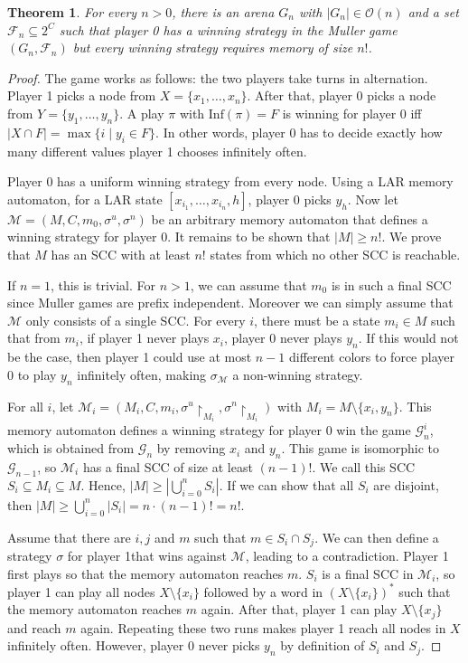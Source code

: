 \documentclass{article}
\newtheorem{theorem}{Theorem}
\begin{document}
\vspace{0.5cm}
\begin{theorem}
	For every $n > 0$, there is an arena $G_n$ with $|G_n| \in \mathcal{O}(n)$ and a set $\mathcal{F}_n \subseteq 2^C$ such that player 0 has a winning strategy in the Muller game $(G_n, \mathcal{F}_n)$ but every winning strategy requires memory of size $n!$.
\end{theorem}
\begin{proof}
	The game works as follows: the two players take turns in alternation. Player 1 picks a node from $X = \{x_1, \dots, x_n\}$. After that, player 0 picks a node from $Y = \{y_1, \dots, y_n\}$. A play $\pi$ with $\text{Inf}(\pi) = F$ is winning for player 0 iff $|X \cap F| = \max \{ i \mid y_i \in F \}$. In other words, player 0 has to decide exactly how many different values player 1 chooses infinitely often.
	
	Player 0 has a uniform winning strategy from every node. Using a LAR memory automaton, for a LAR state $[x_{i_1}, \dots, x_{i_n}, h]$, player 0 picks $y_h$. Now let $\mathcal{M} = (M, C, m_0, \sigma^u, \sigma^n)$ be an arbitrary memory automaton that defines a winning strategy for player 0. It remains to be shown that $|M| \geq n!$. We prove that $M$ has an SCC with at least $n!$ states from which no other SCC is reachable.
	
	If $n = 1$, this is trivial. For $n > 1$, we can assume that $m_0$ is in such a final SCC since Muller games are prefix independent. Moreover we can simply assume that $\mathcal{M}$ only consists of a single SCC. For every $i$, there must be a state $m_i \in M$ such that from $m_i$, if player 1 never plays $x_i$, player 0 never plays $y_n$. If this would not be the case, then player 1 could use at most $n-1$ different colors to force player 0 to play $y_n$ infinitely often, making $\sigma_\mathcal{M}$ a non-winning strategy. 
	
	For all $i$, let $\mathcal{M}_i = (M_i, C, m_i, \sigma^u \upharpoonright_{M_i}, \sigma^n \upharpoonright_{M_i})$ with $M_i = M \setminus \{x_i, y_n\}$. This memory automaton defines a winning strategy for player 0 win the game $\mathcal{G}_n^i$, which is obtained from $\mathcal{G}_n$ by removing $x_i$ and $y_n$. This game is isomorphic to $\mathcal{G}_{n-1}$, so $\mathcal{M}_i$ has a final SCC of size at least $(n-1)!$. We call this SCC $S_i \subseteq M_i \subseteq M$. Hence, $|M| \geq |\bigcup_{i=0}^n S_i|$. If we can show that all $S_i$ are disjoint, then $|M| \geq \bigcup_{i=0}^n |S_i| = n \cdot (n-1)! = n!$.
	
	Assume that there are $i, j$ and $m$ such that $m \in S_i \cap S_j$. We can then define a strategy $\sigma$ for player 1that wins against $\mathcal{M}$, leading to a contradiction. Player 1 first plays so that the memory automaton reaches $m$. $S_i$ is a final SCC in $\mathcal{M}_i$, so player 1 can play all nodes $X \setminus \{x_i\}$ followed by a word in $(X \setminus \{x_i\})^*$ such that the memory automaton reaches $m$ again. After that, player 1 can play $X \setminus \{x_j\}$ and reach $m$ again. Repeating these two runs makes player 1 reach all nodes in $X$ infinitely often. However, player 0 never picks $y_n$ by definition of $S_i$ and $S_j$.
\end{proof}
\end{document}
